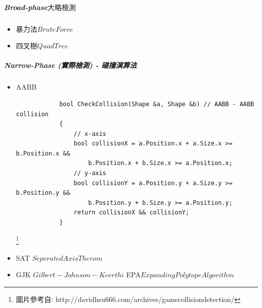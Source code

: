 
\subparagraph{Broad-phase\(大略檢測\)}

\begin{itemize}
    \item{暴力法\(Brute Force\)}
    \item{四叉樹\(QuadTree\)}   
\end{itemize}



\subparagraph{Narrow-Phase (實際檢測) - 碰撞演算法}
\begin{itemize}
    \item{AABB}
        \begin{lstlisting}
            bool CheckCollision(Shape &a, Shape &b) // AABB - AABB collision
            {
                // x-axis
                bool collisionX = a.Position.x + a.Size.x >= b.Position.x &&
                    b.Position.x + b.Size.x >= a.Position.x;
                // y-axis
                bool collisionY = a.Position.y + a.Size.y >= b.Position.y &&
                    b.Position.y + b.Size.y >= a.Position.y;
                return collisionX && collisionY;
            }  
        \end{lstlisting}
\footnote{圖片參考自: http://davidhsu666.com/archives/gamecollisiondetection/}
    \item{SAT \(Seperated Axis Therom\)}
    \item{GJK \(Gilbert-Johnson-Keerthi\) EPA\(Expanding Polytope Algorithm\)}
\end{itemize}

